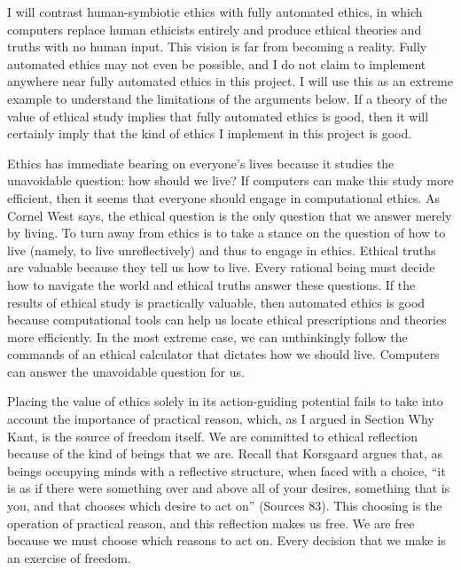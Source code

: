 \begin{isabellebody}
\begin{isamarkuptext}
I will contrast human-symbiotic ethics with fully automated ethics, in which computers replace human
ethicists entirely and produce ethical theories and truths with no human input. This vision is far
from becoming a reality. Fully automated ethics may not even be possible, and I do not claim to implement 
anywhere near fully automated ethics in this project. I will use this as an extreme example to understand
the limitations of the arguments below. If a theory of the value of ethical study implies that 
fully automated ethics is good, then it will certainly imply that the kind of ethics I implement
in this project is good.%
\end{isamarkuptext}\isamarkuptrue%
%
\isadelimdocument
%
\endisadelimdocument
%
\isatagdocument
%
\isamarkuptrue%
%
\endisatagdocument
{\isafolddocument}%
%
\isadelimdocument
%
\endisadelimdocument
%
\begin{isamarkuptext}%
Ethics has immediate bearing on everyone’s lives because it studies the unavoidable question: 
how should we live? If computers can make this study more efficient, then it seems that everyone should
engage in computational ethics. As Cornel West says, the ethical question is the only question that 
we answer merely by living. To turn away from ethics is to take a stance on the question of how to 
live (namely, to live unreflectively) and thus to engage in ethics. Ethical truths are valuable because 
they tell us how to live. Every rational being must decide how to navigate the world and ethical 
truths answer these questions. If the results of ethical study is practically valuable, then automated 
ethics is good because computational tools can help us locate ethical prescriptions and theories more efficiently. 
In the most extreme case, we can unthinkingly follow the commands of an ethical calculator that dictates 
how we should live. Computers can answer the unavoidable question for us.

Placing the value of ethics solely in its action-guiding potential fails to take into account the 
importance of practical reason, which, as I argued in Section Why Kant, is the source
of freedom itself. 
We are committed to ethical reflection because of the kind of beings that we are. Recall that Korsgaard 
argues that, as beings occupying minds with a reflective structure, when faced with a choice, “it is as if there 
were something over and above all of your desires, something that is you, and that chooses which desire 
to act on” (Sources 83). This choosing is the operation of practical reason, and this reflection
makes us free. We are free because we must choose which reasons to act on. Every decision that we 
make is an exercise of freedom. 


\end{isamarkuptext}
\end{isabellebody}
